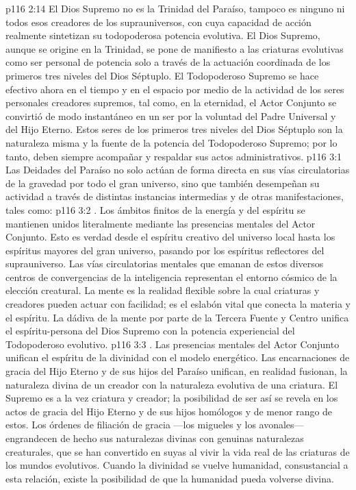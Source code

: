 \vs p116 2:14 El Dios Supremo no es la Trinidad del Paraíso, tampoco es ninguno ni todos esos creadores de los suprauniversos, con cuya capacidad de acción realmente sintetizan su todopoderosa potencia evolutiva. El Dios Supremo, aunque se origine en la Trinidad, se pone de manifiesto a las criaturas evolutivas como ser personal de potencia solo a través de la actuación coordinada de los primeros tres niveles del Dios Séptuplo. El Todopoderoso Supremo se hace efectivo ahora en el tiempo y en el espacio por medio de la actividad de los seres personales creadores supremos, tal como, en la eternidad, el Actor Conjunto se convirtió de modo instantáneo en un ser por la voluntad del Padre Universal y del Hijo Eterno. Estos seres de los primeros tres niveles del Dios Séptuplo son la naturaleza misma y la fuente de la potencia del Todopoderoso Supremo; por lo tanto, deben siempre acompañar y respaldar sus actos administrativos.
\vs p116 3:1 Las Deidades del Paraíso no solo actúan de forma directa en sus vías circulatorias de la gravedad por todo el gran universo, sino que también desempeñan su actividad a través de distintas instancias intermedias y de otras manifestaciones, tales como:
\vs p116 3:2 . Los ámbitos finitos de la energía y del espíritu se mantienen unidos literalmente mediante las presencias mentales del Actor Conjunto. Esto es verdad desde el espíritu creativo del universo local hasta los espíritus mayores del gran universo, pasando por los espíritus reflectores del suprauniverso. Las vías circulatorias mentales que emanan de estos diversos centros de convergencias de la inteligencia representan el entorno cósmico de la elección creatural. La mente es la realidad flexible sobre la cual criaturas y creadores pueden actuar con facilidad; es el eslabón vital que conecta la materia y el espíritu. La dádiva de la mente por parte de la Tercera Fuente y Centro unifica el espíritu\hyp{}persona del Dios Supremo con la potencia experiencial del Todopoderoso evolutivo.
\vs p116 3:3 . Las presencias mentales del Actor Conjunto unifican el espíritu de la divinidad con el modelo energético. Las encarnaciones de gracia del Hijo Eterno y de sus hijos del Paraíso unifican, en realidad fusionan, la naturaleza divina de un creador con la naturaleza evolutiva de una criatura. El Supremo es a la vez criatura y creador; la posibilidad de ser así se revela en los actos de gracia del Hijo Eterno y de sus hijos homólogos y de menor rango de estos. Los órdenes de filiación de gracia ---los migueles y los avonales--- engrandecen de hecho sus naturalezas divinas con genuinas naturalezas creaturales, que se han convertido en suyas al vivir la vida real de las criaturas de los mundos evolutivos. Cuando la divinidad se vuelve humanidad, consustancial a esta relación, existe la posibilidad de que la humanidad pueda volverse divina.

